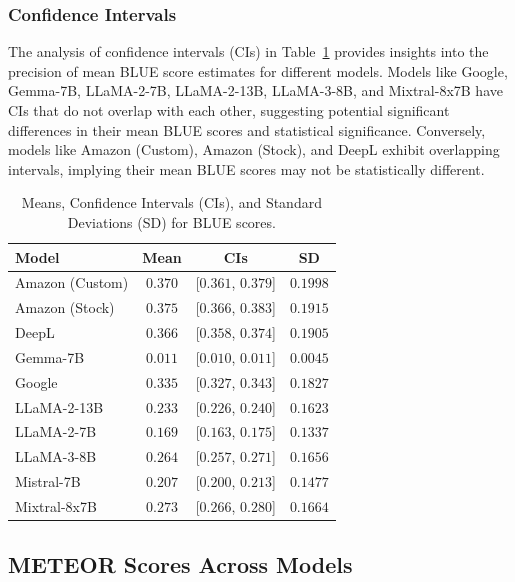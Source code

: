 \subsubsection{Confidence Intervals}

The analysis of confidence intervals (CIs) in Table~\ref{tab:mean_ci_scores_blue} provides insights into the precision of mean BLUE score estimates for different models. Models like Google, Gemma-7B, LLaMA-2-7B, LLaMA-2-13B, LLaMA-3-8B, and Mixtral-8x7B have CIs that do not overlap with each other, suggesting potential significant differences in their mean BLUE scores and statistical significance. Conversely, models like Amazon (Custom), Amazon (Stock), and DeepL exhibit overlapping intervals, implying their mean BLUE scores may not be statistically different.

\begin{table}[htb]
\centering
\begin{tabular}{lccc}
\toprule
\textbf{Model} & \textbf{Mean} & \textbf{CIs} & \textbf{SD} \\
\midrule
Amazon (Custom) & $0.370$ & [$0.361$, $0.379$] & $0.1998$ \\
Amazon (Stock) & $\mathbf{0.375}$ & [$0.366$, $0.383$] & $0.1915$ \\
DeepL & $0.366$ & [$0.358$, $0.374$] & $0.1905$ \\
Gemma-7B & $0.011$ & [$0.010$, $0.011$] & $0.0045$ \\
Google & $0.335$ & [$0.327$, $0.343$] & $0.1827$ \\
LLaMA-2-13B & $0.233$ & [$0.226$, $0.240$] & $0.1623$ \\
LLaMA-2-7B & $0.169$ & [$0.163$, $0.175$] & $0.1337$ \\
LLaMA-3-8B & $0.264$ & [$0.257$, $0.271$] & $0.1656$ \\
Mistral-7B & $0.207$ & [$0.200$, $0.213$] & $0.1477$ \\
Mixtral-8x7B & $0.273$ & [$0.266$, $0.280$] & $0.1664$ \\
\bottomrule
\end{tabular}
\caption{Means, Confidence Intervals (CIs), and Standard Deviations (SD) for BLUE scores.}
\label{tab:mean_ci_scores_blue}
\end{table}



\subsection{METEOR Scores Across Models}

